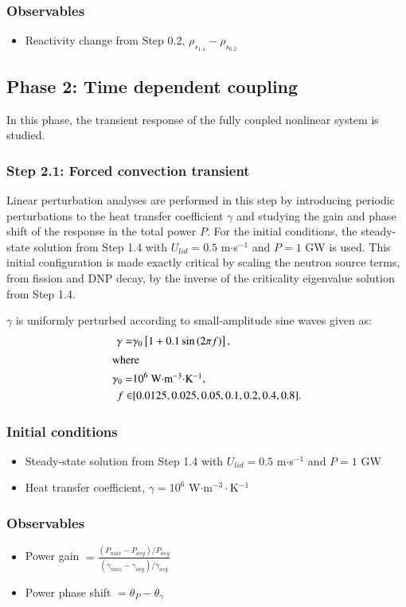 \subsubsection*{Observables}
\begin{itemize}
    \item Reactivity change from Step 0.2, $\rho_{s_{1.4}} - \rho_{s_{0.2}}$
\end{itemize}

\subsection{Phase 2: Time dependent coupling}

In this phase, the transient response of the fully coupled nonlinear system is
studied.

\subsubsection{Step 2.1: Forced convection transient}

Linear perturbation analyses are performed in this step by introducing periodic
perturbations to the heat transfer coefficient $\gamma$ and studying the gain
and phase shift of the response in the total power $P$. For the initial
conditions, the steady-state solution from Step 1.4 with
$U_{lid} = 0.5$ m$\cdot$s$^{-1}$ and $P = 1$ GW is used. This initial
configuration is made exactly critical by scaling the neutron source terms,
from fission and \gls{DNP} decay, by the inverse of the criticality eigenvalue
solution from Step 1.4.

$\gamma$ is uniformly perturbed according to small-amplitude sine waves given
as:
\begin{align}
    \gamma =& \gamma_0 \left[ 1 + 0.1\sin\left(2 \pi f \right) \right], \\
    \intertext{where}
    \gamma_0 =& 10^6 \mbox{ W$\cdot$m$^{-3}\cdot$K$^{-1}$}, \nonumber \\
    f \in& [0.0125, 0.025, 0.05, 0.1, 0.2, 0.4, 0.8]. \nonumber
\end{align}

\subsubsection*{Initial conditions}
\begin{itemize}
    \item Steady-state solution from Step 1.4 with
    $U_{lid} = 0.5$ m$\cdot$s$^{-1}$ and $P = 1$ GW
    \item Heat transfer coefficient, $\gamma = 10^6$ W$\cdot$m$^{-3}\cdot$K$^{-1}$
\end{itemize}
%
\subsubsection*{Observables}
\begin{itemize}
    \item Power gain $= \frac{\left(P_{max} - P_{avg}\right)/P_{avg}}{
    \left(\gamma_{max} - \gamma_{avg}\right)/\gamma_{avg}}$
    \item Power phase shift $=\theta_P - \theta_\gamma$
\end{itemize}
